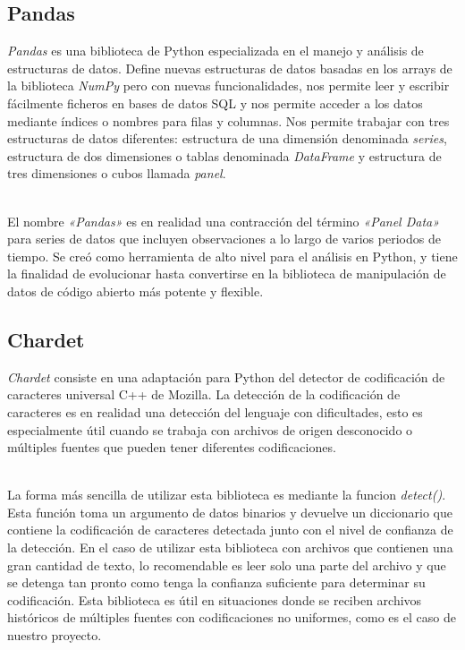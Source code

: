 \documentclass[a4paper, 12pt]{book}
\begin{document}
\subsection{Pandas}
\label{subsec:pandas}
\textit{Pandas} es una biblioteca de Python especializada en el manejo y análisis de estructuras de datos. Define nuevas estructuras de datos basadas en los arrays de la biblioteca \textit{NumPy} pero
con nuevas funcionalidades, nos permite leer y escribir fácilmente ficheros en bases de datos SQL y nos permite acceder a los datos mediante índices o nombres para filas y columnas.
Nos permite trabajar con tres estructuras de datos diferentes: estructura de una dimensión denominada \textit{series}, estructura de dos dimensiones o tablas denominada \textit{DataFrame} y estructura
de tres dimensiones o cubos llamada \textit{panel}.

\\El nombre \textit{«Pandas»} es en realidad una contracción del término \textit{«Panel Data»} para series de datos que incluyen observaciones a lo largo de varios periodos de tiempo. Se creó como herramienta
de alto nivel para el análisis en Python, y tiene la finalidad de evolucionar hasta convertirse en la biblioteca de manipulación de datos de código abierto más potente y flexible.

\subsection{Chardet}
\label{subsec:chardet}

\textit{Chardet} consiste en una adaptación para Python del detector de codificación de caracteres universal C++ de Mozilla. La detección de la codificación de caracteres es en realidad una detección del lenguaje
con dificultades, esto es especialmente útil cuando se trabaja con archivos de origen desconocido o múltiples fuentes que pueden tener diferentes codificaciones.

\\La forma más sencilla de utilizar esta biblioteca es mediante la funcion \textit{detect()}. Esta función toma un argumento de datos binarios y devuelve un diccionario que contiene la codificación de caracteres detectada
junto con el nivel de confianza de la detección. En el caso de utilizar esta biblioteca con archivos que contienen una gran cantidad de texto, lo recomendable es leer solo una parte del archivo y que se detenga tan pronto
como tenga la confianza suficiente para determinar su codificación. Esta biblioteca es útil en situaciones donde se reciben archivos históricos de múltiples fuentes con codificaciones no uniformes, como es el caso de nuestro proyecto.
\end{document}
